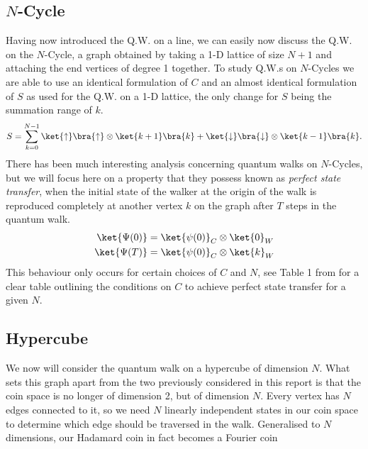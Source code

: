 \subsection{\texorpdfstring{$N$}{N}-Cycle}
Having now introduced the Q.W. on a line, we can easily now discuss the Q.W. on the $N$-Cycle, a graph obtained by taking a 1-D lattice of size $N + 1$ and attaching the end vertices of degree 1 together. To study Q.W.s on $N$-Cycles we are able to use an identical formulation of $C$ and an almost identical formulation of $S$ as used for the Q.W. on a 1-D lattice, the only change for $S$ being the summation range of $k$.
\begin{equation}
    S = \sum_{k=0}^{N - 1}\ket{\uparrow}\bra{\uparrow} \otimes \ket{k + 1}\bra{k} + \ket{\downarrow}\bra{\downarrow} \otimes \ket{k - 1}\bra{k}.
\end{equation}
There has been much interesting analysis concerning quantum walks on $N$-Cycles, but we will focus here on a property that they possess known as \emph{perfect state transfer}, when the initial state of the walker at the origin of the walk is reproduced completely at another vertex $k$ on the graph after $T$ steps in the quantum walk.
\begin{align}
    \ket{\Psi(0)} &= \ket{\psi(0)}_C \otimes \ket{0}_W\\
    \ket{\Psi(T)} &= \ket{\psi(0)}_C \otimes \ket{k}_W
\end{align}
This behaviour only occurs for certain choices of $C$ and $N$, see Table 1 from \cite{kendon2010} for a clear table outlining the conditions on $C$ to achieve perfect state transfer for a given $N$.

\subsection{Hypercube}
We now will consider the quantum walk on a hypercube of dimension $N$. What sets this graph apart from the two previously considered in this report is that the coin space is no longer of dimension 2, but of dimension $N$. Every vertex has $N$ edges connected to it, so we need $N$ linearly independent states in our coin space to determine which edge should be traversed in the walk. Generalised to $N$ dimensions, our Hadamard coin in fact becomes a Fourier coin